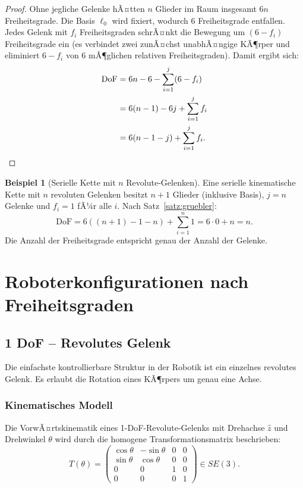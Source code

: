 ﻿\documentclass[a4paper,12pt]{article}
\theoremstyle{definition}
\newtheorem{beispiel}{Beispiel}
\begin{document}
\begin{proof}
	Ohne jegliche Gelenke hÃ¤tten $n$ Glieder im Raum insgesamt $6n$ Freiheitsgrade. Die Basis $\ell_0$ wird fixiert, wodurch $6$ Freiheitsgrade entfallen. Jedes Gelenk mit $f_i$ Freiheitsgraden schrÃ¤nkt die Bewegung um $(6 - f_i)$ Freiheitsgrade ein (es verbindet zwei zunÃ¤chst unabhÃ¤ngige KÃ¶rper und eliminiert $6 - f_i$ von 6 mÃ¶glichen relativen Freiheitsgraden). Damit ergibt sich:
	\begin{align*}
		\text{DoF} &= 6n - 6 - \sum_{i=1}^{j}(6 - f_i) \\
		           &= 6(n-1) - 6j + \sum_{i=1}^{j} f_i \\
		           &= 6(n-1-j) + \sum_{i=1}^{j} f_i. \qedhere
	\end{align*}
\end{proof}

\begin{beispiel}[Serielle Kette mit $n$ Revolute-Gelenken]
	Eine serielle kinematische Kette mit $n$ revoluten Gelenken besitzt $n+1$ Glieder (inklusive Basis), $j = n$ Gelenke und $f_i = 1$ fÃ¼r alle $i$. Nach Satz~\ref{satz:gruebler}:
	\[
		\text{DoF} = 6((n+1) - 1 - n) + \sum_{i=1}^{n} 1 = 6 \cdot 0 + n = n.
	\]
	Die Anzahl der Freiheitsgrade entspricht genau der Anzahl der Gelenke.
\end{beispiel}

\section{Roboterkonfigurationen nach Freiheitsgraden}

\subsection{1 DoF -- Revolutes Gelenk}

Die einfachste kontrollierbare Struktur in der Robotik ist ein einzelnes revolutes Gelenk. Es erlaubt die Rotation eines KÃ¶rpers um genau eine Achse.

\subsubsection{Kinematisches Modell}

Die VorwÃ¤rtskinematik eines 1-DoF-Revolute-Gelenks mit Drehachse $\hat{z}$ und Drehwinkel $\theta$ wird durch die homogene Transformationsmatrix beschrieben:
\[
T(\theta) = \begin{pmatrix}
	\cos\theta & -\sin\theta & 0 & 0 \\
	\sin\theta &  \cos\theta & 0 & 0 \\
	0          &  0          & 1 & 0 \\
	0          &  0          & 0 & 1
\end{pmatrix} \in SE(3).
\]
\end{document}
